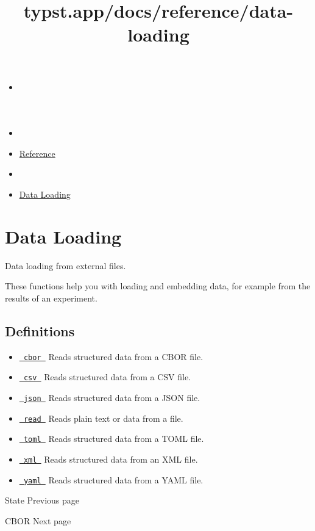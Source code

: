 \title{typst.app/docs/reference/data-loading}

\begin{itemize}
\tightlist
\item
  \href{/docs}{}
\item
  
\item
  \href{/docs/reference/}{Reference}
\item
  
\item
  \href{/docs/reference/data-loading/}{Data Loading}
\end{itemize}

\section{Data Loading}\label{summary}

Data loading from external files.

These functions help you with loading and embedding data, for example
from the results of an experiment.

\subsection{Definitions}\label{definitions}

\begin{itemize}
\tightlist
\item
  \href{/docs/reference/data-loading/cbor/}{\texttt{\ cbor\ }} { Reads
  structured data from a CBOR file. }
\item
  \href{/docs/reference/data-loading/csv/}{\texttt{\ csv\ }} { Reads
  structured data from a CSV file. }
\item
  \href{/docs/reference/data-loading/json/}{\texttt{\ json\ }} { Reads
  structured data from a JSON file. }
\item
  \href{/docs/reference/data-loading/read/}{\texttt{\ read\ }} { Reads
  plain text or data from a file. }
\item
  \href{/docs/reference/data-loading/toml/}{\texttt{\ toml\ }} { Reads
  structured data from a TOML file. }
\item
  \href{/docs/reference/data-loading/xml/}{\texttt{\ xml\ }} { Reads
  structured data from an XML file. }
\item
  \href{/docs/reference/data-loading/yaml/}{\texttt{\ yaml\ }} { Reads
  structured data from a YAML file. }
\end{itemize}

\href{/docs/reference/introspection/state/}{\pandocbounded{}}

{ State } { Previous page }

\href{/docs/reference/data-loading/cbor/}{\pandocbounded{}}

{ CBOR } { Next page }
